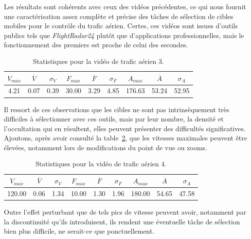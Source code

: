 	Les résultats sont cohérents avec ceux des vidéos précédentes, ce qui nous fournit une caractérisation assez complète et précise des tâches de sélection de cibles mobiles pour le contrôle du trafic aérien. Certes, ces vidéos sont issues d'outils publics tels que \emph{FlightRadar24} plutôt que d'applications professionnelles, mais le fonctionnement des premiers est proche de celui des secondes.
	
\begin{table}
	\centering
	\begin{tabular}{c c c c c c c c c}
		$V_{max}$	& $\overline{V}$	& $\sigma_{V}$	& $F_{max}$	& $\overline{F}$	& $\sigma_{F}$	& $A_{max}$	& $\overline{A}$	& $\sigma_{A}$	\bigstrut[b] \\ \hline

		4.21		& 0.07				& 0.39			& 30.00		& 3.29				& 4.85			& 176.63	& 53.24				& 52.95			\bigstrut[t] \\
	\end{tabular}
	\caption[Statistiques pour la vidéo  de trafic aérien 3]{Statistiques pour la vidéo  de trafic aérien 3.}
	\label{tab:hkg_stats}
\end{table}

	Il ressort de ces observations que les cibles ne sont pas intrinsèquement très difficiles à sélectionner avec ces outils, mais par leur nombre, la densité et l'occultation qui en résultent, elles peuvent présenter des difficultés significatives. Ajoutons, après avoir consulté la table~\ref{tab:flightradar2a_stats}, que les vitesses maximales peuvent être élevées, notamment lors de modifications du point de vue ou zooms.

\begin{table}
	\centering
	\begin{tabular}{c c c c c c c c c}
		$V_{max}$	& $\overline{V}$	& $\sigma_{V}$	& $F_{max}$	& $\overline{F}$	& $\sigma_{F}$	& $A_{max}$	& $\overline{A}$	& $\sigma_{A}$	\bigstrut[b] \\ \hline

		120.00		& 0.06				& 1.34			& 10.00		& 1.30				& 1.96			& 180.00	& 54.65				& 47.58			\bigstrut[t] \\
	\end{tabular}
	\caption[Statistiques pour la vidéo  de trafic aérien 4]{Statistiques pour la vidéo  de trafic aérien 4.}
	\label{tab:flightradar2a_stats}
\end{table}

	Outre l'effet perturbant que de tels pics de vitesse peuvent avoir, notamment par la discontinuité qu'ils introduisent, ils rendent une éventuelle tâche de sélection bien plus difficile, ne serait-ce que ponctuellement.
	

